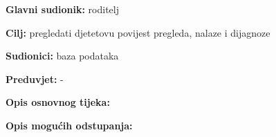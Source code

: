                     \noindent {}
					\begin{packed_item}
	
						\item \textbf{Glavni sudionik: }roditelj
						\item  \textbf{Cilj:} pregledati djetetovu povijest pregleda, nalaze i dijagnoze
						\item  \textbf{Sudionici:} baza podataka
						\item  \textbf{Preduvjet:} -
						\item  \textbf{Opis osnovnog tijeka:}
						
						\item[] \begin{packed_enum}
	
							\item 
							\item 
							\item 

						\end{packed_enum}
						
						\item  \textbf{Opis mogućih odstupanja:}
						
						\item[] \begin{packed_item}
	
							\item[2.a] 
							\item[] \begin{packed_enum}
								
								\item 
								\item 
							\end{packed_enum}
							
						\end{packed_item}
					\end{packed_item}

